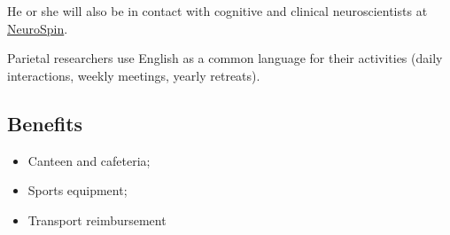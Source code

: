 \documentclass{article}
\begin{document}
He or she will also be in contact with cognitive and clinical neuroscientists at \href{https://joliot.cea.fr/drf/joliot/Pages/Entites_de_recherche/NeuroSpin.aspx}{NeuroSpin}.

Parietal researchers use English as a common language for their activities (daily interactions, weekly meetings, yearly retreats).

\subsection*{Benefits}

\begin{itemize}
	\item Canteen and cafeteria;
	\item Sports equipment;
	\item Transport reimbursement 
\end{itemize}

% 
%
\end{document}
